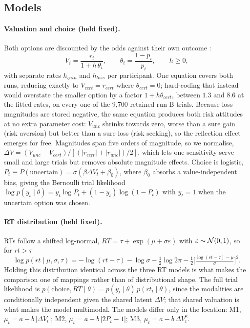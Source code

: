 \documentclass[11pt,a4paper]{article}
\begin{document}
\subsection{Models}

\paragraph{Valuation and choice (held fixed).}
Both options are discounted by the odds against their own outcome \citep{rachlin1991}:
\begin{equation}
V_i=\frac{r_i}{1+h\,\theta_i},\qquad \theta_i=\frac{1-p_i}{p_i},\qquad h\ge0,
\end{equation}
with separate rates $h_{gain}$ and $h_{loss}$ per participant. One equation covers both runs,
reducing exactly to $V_{cert}=r_{cert}$ where $\theta_{cert}=0$; hard-coding that instead would
overstate the smaller option by a factor $1+h\theta_{cert}$, between $1.3$ and $8.6$ at the
fitted rates, on every one of the 9{,}700 retained run B trials. Because loss magnitudes are
stored negative, the same equation produces both risk attitudes at no extra parameter cost:
$V_{unc}$ shrinks towards zero, worse than a sure gain (risk aversion) but better than a sure
loss (risk seeking), so the reflection effect emerges for free.
Magnitudes span five orders of magnitude, so we normalise,
$\Delta V=(V_{unc}-V_{cert})/[(|r_{cert}|+|r_{unc}|)/2]$, which lets one sensitivity serve small
and large trials but removes absolute magnitude effects. Choice is
logistic, $P_t\equiv P(\text{uncertain})=\sigma(\beta\Delta V_t+\beta_0)$, where $\beta_0$
absorbs a value-independent bias, giving the Bernoulli trial likelihood
$\log p(y_t\mid\theta)=y_t\log P_t+(1-y_t)\log(1-P_t)$ with $y_t=1$ when the uncertain option
was chosen.

\paragraph{RT distribution (held fixed).}
RTs follow a shifted log-normal, $RT=\tau+\exp(\mu+\sigma\varepsilon)$ with
$\varepsilon\sim\mathcal{N}(0,1)$, so for $rt>\tau$
\begin{equation}
\log p(rt\mid\mu,\sigma,\tau)=-\log(rt-\tau)-\log\sigma-\tfrac12\log2\pi
-\tfrac12\Big[\tfrac{\log(rt-\tau)-\mu}{\sigma}\Big]^2 .
\end{equation}
Holding this distribution identical across the three RT models is what makes the comparison one
of mappings rather than of distributional shape. The full trial likelihood is
$p(\text{choice},RT\mid\theta)=p(y_t\mid\theta)\,p(rt_t\mid\theta)$, since the modalities are
conditionally independent given the shared latent $\Delta V$; that shared valuation is what
makes the model multimodal. The models differ only in the location:
M1, $\mu_t=a-b\,|\Delta V_t|$; M2, $\mu_t=a-b\,|2P_t-1|$; M3, $\mu_t=a-b\,\Delta V_t^{2}$.
\end{document}
